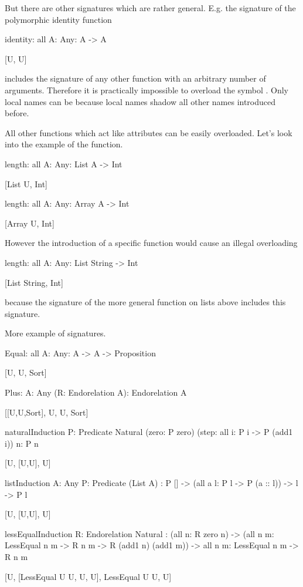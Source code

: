 But there are other signatures which are rather general. E.g. the signature of
the polymorphic identity function
%
\begin{alba}
    identity: all {A: Any}: A -> A

        [U, U]
\end{alba}
%
includes the signature of any other function with an arbitrary number of
arguments. Therefore it is practically impossible to overload the symbol
. Only local names can be  because local names
shadow all other names introduced before.

All other functions which act like attributes can be easily overloaded. Let's
look into the example of the  function.

\begin{alba}
    length: all {A: Any}: List A -> Int

        [List U, Int]


    length: all {A: Any}: Array A -> Int

        [Array U, Int]
\end{alba}
%
However the introduction of a specific  function would cause an
illegal overloading
\begin{alba}
    length: all {A: Any}: List String -> Int

        [List String, Int]
\end{alba}
because the signature of the more general  function on lists above
includes this signature.


More example of signatures.
%
\begin{alba}

    Equal: all {A: Any}: A -> A -> Proposition

        [U, U, Sort]


    Plus: {A: Any} (R: Endorelation A): Endorelation A

        [[U,U,Sort], U, U, Sort]


    naturalInduction {P: Predicate Natural}
        (zero: P zero) (step: all {i}: P i -> P (add1 i))
        {n}: P n

        [U, [U,U], U]


    listInduction {A: Any} {P: Predicate (List A)}
        : P [] -> (all {a l}: P l -> P (a :: l)) -> {l} -> P l

        [U, [U,U], U]


    lessEqualInduction {R: Endorelation Natural}
        :   (all {n}: R zero n)
            -> (all {n m}: LessEqual n m -> R n m -> R (add1 n) (add1 m))
            -> all {n m}: LessEqual n m -> R n m

        [U, [LessEqual U U, U, U], LessEqual U U, U]

\end{alba}




